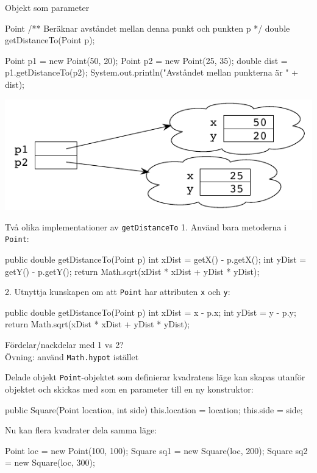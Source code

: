 \documentclass{lecturenotes}
\begin{document}
\begin{Slide}{Objekt som parameter}
\begin{ClassSpec}{Point}
/** Beräknar avståndet mellan denna punkt och punkten p */
double getDistanceTo(Point p);
\end{ClassSpec}
\begin{Code}
Point p1 = new Point(50, 20);
Point p2 = new Point(25, 35);
double dist = p1.getDistanceTo(p2);
System.out.println("Avståndet mellan punkterna är " + dist);
\end{Code}
\begin{center}
\includegraphics[scale=1.0]{img/distobjects.pdf}
\end{center}
\end{Slide} 

\begin{Slide}{Två olika implementationer av \texttt{getDistanceTo}}
1. Använd bara metoderna i \texttt{Point}:
\begin{Code}
public double getDistanceTo(Point p) {
	int xDist = getX() - p.getX();
	int yDist = getY() - p.getY();
	return Math.sqrt(xDist * xDist + yDist * yDist);
}
\end{Code}

2. Utnyttja kunskapen om att \texttt{Point} har attributen \texttt{x} och \texttt{y}:
\begin{Code}
public double getDistanceTo(Point p) {
	int xDist = x - p.x;
	int yDist = y - p.y;
	return Math.sqrt(xDist * xDist + yDist * yDist);
}
\end{Code}
Fördelar/nackdelar med 1 vs 2?\\
Övning: använd \texttt{Math.hypot} istället
\end{Slide} 

\begin{Slide}{Delade objekt}
\texttt{Point}-objektet som definierar kvadratens läge kan skapas utanför objektet och skickas med som en parameter till en ny konstruktor:

\begin{Code}
public Square(Point location, int side) {
    this.location = location;
    this.side = side;
}
\end{Code}

Nu kan flera kvadrater dela samma läge:

\begin{Code}
Point loc = new Point(100, 100);
Square sq1 = new Square(loc, 200);
Square sq2 = new Square(loc, 300);
\end{Code}
\end{Slide} 
\end{document}
